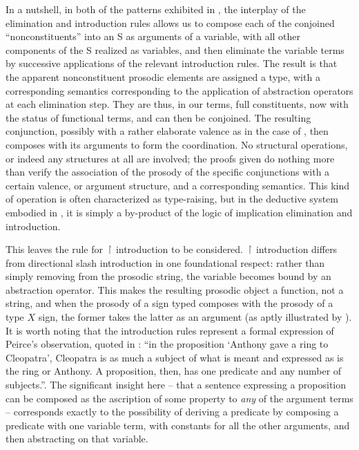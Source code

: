 \documentclass[output=paper,colorlinks,citecolor=brown]{langscibook}
\begin{document}
In a nutshell, in both of the patterns exhibited in , the
interplay of the elimination and introduction rules allows us to
compose each of the conjoined ``nonconstituents'' into an S as arguments
of a variable, with all other components of the S realized as
variables, and then eliminate the variable terms by successive
applications of the relevant introduction rules. The result is that
the apparent nonconstituent prosodic elements are assigned a type,
with a corresponding semantics corresponding to the application of
abstraction operators at each elimination step. They are thus, in our
terms, full constituents, now with the status of functional terms, and
can then be conjoined. The resulting conjunction, possibly with a
rather elaborate valence as in the case of , then composes with
its arguments to form the coordination. No structural operations, or
indeed any structures at all are involved; the proofs given do
nothing more than verify the association of the prosody of the
specific conjunctions with a certain valence, or argument structure,
and a corresponding semantics. This kind of operation is often
characterized as type-raising, but in the deductive system embodied in
, it is simply a by-product of the logic of implication
elimination and introduction.

This leaves the rule for \ensuremath{\vs} introduction to be considered. \ensuremath{\vs}
introduction differs from directional slash introduction in one
foundational respect: rather than simply removing \pt{ \ensuremath{\greekp} } from the
prosodic string, the variable becomes bound by an abstraction
operator. This makes the resulting prosodic object a function, not a
string, and when the prosody of a sign typed  composes with
the prosody of a type $X$ sign, the former takes the latter as an
argument (as aptly illustrated by ).  It is worth
noting that the introduction rules represent a formal expression of
Peirce's observation, quoted in \citet[8]{nothPeirce}: ``in the proposition
{`}Anthony gave a ring to Cleopatra', Cleopatra is as much a subject of what is
meant and expressed as is the ring or Anthony. A proposition, then,
has one predicate and any number of subjects.''. The significant insight
here -- that a sentence expressing a proposition can be composed as the
ascription of some property to \emph{any} of the argument
terms -- corresponds exactly to the possibility of deriving a predicate
by composing a predicate with one variable term, with constants for
all the other arguments, and then abstracting on that
variable.
\end{document}

